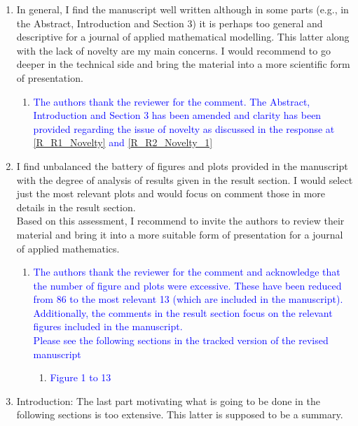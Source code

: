 \documentclass[11pt]{letter} %
\newcommand{\blue}{\textcolor{blue}}
\begin{document}
\begin{letter}
{\begin{enumerate}
\begin{enumerate}
\begin{enumerate}
\begin{enumerate}
   \end{enumerate}
        \end{enumerate}
\item \label{R_R2_TooDesc} In general, I find the manuscript well written although in some parts (e.g., in the Abstract, Introduction and Section 3) it is perhaps too general and descriptive for a journal of applied mathematical modelling. This latter along with the lack of novelty are my main concerns. I would recommend to go deeper in the technical side and bring the material into a more scientific form of presentation.
   \begin{enumerate}
   \item \label{R_R2_TooDesc_1} \blue{The authors thank the reviewer for the comment. The Abstract, Introduction and Section 3 has been amended and clarity has been provided regarding the issue of novelty as discussed in the response at \ref{R_R1_Novelty} and \ref{R_R2_Novelty_1}}\\
        \end{enumerate}
      \item \label{R_R2_TooMuchFig} I find unbalanced the battery of figures and plots provided in the manuscript with the degree of analysis of results given in the result section. I would select just the most relevant plots and would focus on comment those in more details in the result section.\\
        Based on this assessment, I recommend to invite the authors to review their material and bring it into a more suitable form of presentation for a journal of applied mathematics.
         \begin{enumerate}
         \item \label{R_R2_TooMuchFig_1} \blue{The authors thank the reviewer for the comment and acknowledge that the number of figure and plots were excessive. These have been reduced from 86 to the most relevant 13 (which are included in the manuscript). Additionally, the comments in the result section focus on the relevant figures included in the manuscript.}\\
           \blue{Please see the following sections in the tracked version of the revised manuscript}
   \begin{enumerate}
 \item \blue{Figure 1 to 13}
   \end{enumerate}
        \end{enumerate}
\item \label{R_R2_TooMuchSum} Introduction: The last part motivating what is going to be done in the following sections is too extensive. This latter is supposed to be a summary.

\end{enumerate}
\end{enumerate}}
\end{letter}
\end{document}
